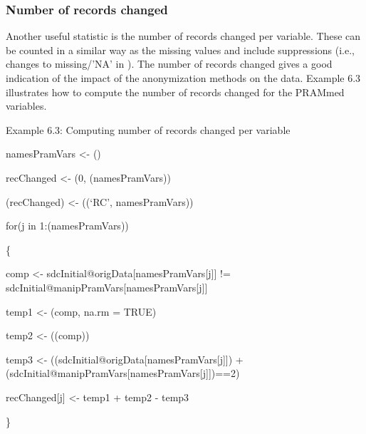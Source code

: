 \documentclass[letterpaper,10pt,english]{sphinxmanual}
\begin{document}
\subsubsection{Number of records changed}
\label{\detokenize{utility:number-of-records-changed}}
Another useful statistic is the number of records changed per variable.
These can be counted in a similar way as the missing values and include
suppressions (i.e., changes to missing/’NA’ in ). The number of
records changed gives a good indication of the impact of the
anonymization methods on the data. Example 6.3 illustrates how to
compute the number of records changed for the PRAMmed variables.

Example 6.3: Computing number of records changed per variable

\begin{DUlineblock}{0em}
\item[] 
\item[] namesPramVars \textless{}- ()
\item[] 
\item[] recChanged \textless{}- (0, (namesPramVars))
\item[] (recChanged) \textless{}- ((‘RC’, namesPramVars))
\item[] 
\item[] for(j in 1:(namesPramVars)) 
\item[] \{
\item[] comp \textless{}- sdcInitial@origData{[}namesPramVars{[}j{]}{]} !=
sdcInitial@manipPramVars{[}namesPramVars{[}j{]}{]}
\item[] temp1 \textless{}- (comp, na.rm = TRUE) 
\item[] temp2 \textless{}- ((comp)) 
\item[] temp3 \textless{}- ((sdcInitial@origData{[}namesPramVars{[}j{]}{]})
+ (sdcInitial@manipPramVars{[}namesPramVars{[}j{]}{]})==2) 
\item[] recChanged{[}j{]} \textless{}- temp1 + temp2 - temp3
\item[] \}
\end{DUlineblock}
\end{document}
